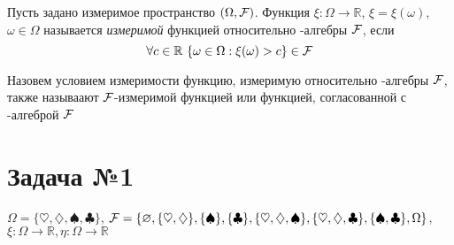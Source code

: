 \documentclass[a4paper, 10pt]{article}
\begin{document}
 Пусть задано измеримое пространство $(\Omega,\mathcal{F})$. Функция $\xi:\Omega\longrightarrow\mathbb{R}$, $\xi=\xi(\omega)$, $\omega\in\Omega$ называется \textit{измеримой} функцией относительно \s-алгебры $\mathcal{F}$, если $$\forall c\in\mathbb{R}\ \{\omega\in\Omega:\xi(\omega)>c\}\in\fk$$

Назовем условием измеримости функцию, измеримую относительно \s-алгебры $\mathcal{F}$, также называают $\mathcal{F}$-измеримой функцией или функцией, согласованной с \s-алгеброй $\mathcal{F}$
    



\section*{Задача №1}
$\Omega=\{\heartsuit, \diamondsuit,\spadesuit,\clubsuit\}$, $\mathcal{F}=\{\varnothing, \{\heartsuit,\diamondsuit\}, \{\spadesuit\}, \{\clubsuit\}, \{\heartsuit,\diamondsuit,\spadesuit\}, \{\heartsuit,\diamondsuit,\clubsuit\}, \{\spadesuit, \clubsuit\}, \Omega\}$, $\xi:\Omega\rightarrow\mathbb{R}, \eta:\Omega\rightarrow\mathbb{R}$
\end{document}
